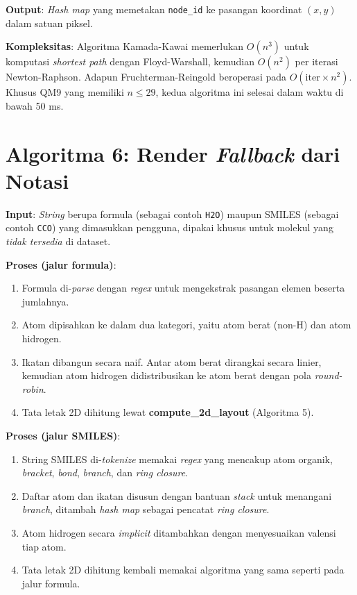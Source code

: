\documentclass[a4paper,12pt]{report}
\begin{document}
\textbf{Output}: \textit{Hash map} yang memetakan \texttt{node\_id} ke pasangan koordinat $(x, y)$ dalam satuan piksel.

\textbf{Kompleksitas}: Algoritma Kamada-Kawai memerlukan $O(n^3)$ untuk komputasi \textit{shortest path} dengan Floyd-Warshall, kemudian $O(n^2)$ per iterasi Newton-Raphson. Adapun Fruchterman-Reingold beroperasi pada $O(\text{iter} \times n^2)$. Khusus QM9 yang memiliki $n \leq 29$, kedua algoritma ini selesai dalam waktu di bawah 50 ms.

\section{Algoritma 6: Render \textit{Fallback} dari Notasi}

\textbf{Input}: \textit{String} berupa formula (sebagai contoh \texttt{H2O}) maupun SMILES (sebagai contoh \texttt{CCO}) yang dimasukkan pengguna, dipakai khusus untuk molekul yang \textit{tidak tersedia} di dataset.

\textbf{Proses (jalur formula)}:

\begin{enumerate}
    \item Formula di-\textit{parse} dengan \textit{regex} untuk mengekstrak pasangan elemen beserta jumlahnya.
    \item Atom dipisahkan ke dalam dua kategori, yaitu atom berat (non-H) dan atom hidrogen.
    \item Ikatan dibangun secara naif. Antar atom berat dirangkai secara linier, kemudian atom hidrogen didistribusikan ke atom berat dengan pola \textit{round-robin}.
    \item Tata letak 2D dihitung lewat \textbf{compute\_2d\_layout} (Algoritma 5).
\end{enumerate}

\textbf{Proses (jalur SMILES)}:

\begin{enumerate}
    \item String SMILES di-\textit{tokenize} memakai \textit{regex} yang mencakup atom organik, \textit{bracket}, \textit{bond}, \textit{branch}, dan \textit{ring closure}.
    \item Daftar atom dan ikatan disusun dengan bantuan \textit{stack} untuk menangani \textit{branch}, ditambah \textit{hash map} sebagai pencatat \textit{ring closure}.
    \item Atom hidrogen secara \textit{implicit} ditambahkan dengan menyesuaikan valensi tiap atom.
    \item Tata letak 2D dihitung kembali memakai algoritma yang sama seperti pada jalur formula.
\end{enumerate}
\end{document}
